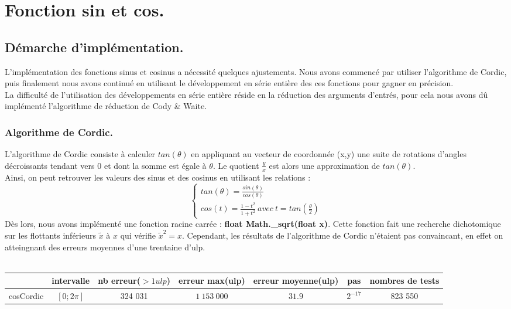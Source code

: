 \documentclass[a4,12pt]{article}
\begin{document}
\section{Fonction sin et cos.}
\subsection{Démarche d'implémentation.}
L'implémentation des fonctions sinus et cosinus a nécessité quelques ajustements. Nous avons commencé par utiliser l'algorithme de Cordic, puis finalement nous avons continué en utilisant le développement en série entière des ces fonctions pour gagner en précision. \\
La difficulté de l'utilisation des développements en série entière réside en la réduction des arguments d'entrés, pour cela nous avons dû implémenté l'algorithme de réduction de Cody \& Waite.
\subsubsection{Algorithme de Cordic.}
L'algorithme de Cordic consiste à calculer $tan(\theta)$ en appliquant au vecteur de coordonnée (x,y) une suite de rotations d'angles décroissants tendant vers 0 et dont la somme est égale à $\theta$. Le quotient $\frac{y}{x}$ est alors une approximation de $tan(\theta)$. \\
Ainsi, on peut retrouver les valeurs des sinus et des cosinus en utilisant les relations : 
$$
 \left \{
    \begin{array}{l}
        tan(\theta) = \frac{sin(\theta)}{cos(\theta)}\ \\
        cos(t) = \frac{1-t^2}{1+t^2}\ avec\ t = tan(\frac{\theta}{2})
    \end{array}
\right .
$$
Dès lors, nous avons implémenté une fonction racine carrée : \textbf{float Math.\_sqrt(float x)}. Cette fonction fait une recherche dichotomique sur les flottants inférieurs $\tilde x$ à $x$ qui vérifie $ \tilde x^2 = x $. Cependant, les résultats de l'algorithme de Cordic n'étaient pas convaincant, en effet on atteingnant des erreurs moyennes d'une trentaine d'ulp. \\
\\

\hspace{-4cm}
\begin{tabular}{|c|c|c|c|c|c|c|}

\hline 
 & intervalle & nb erreur($ >1 ulp$) & erreur max(ulp) & erreur moyenne(ulp) & pas & nombres de tests \\
\hline 
cosCordic & $[0; 2\pi]$ & 324 031 & $1\ 153\ 000$  & $31.9$ & $2^{-17}$ & 823 550 \\
\hline
\end{tabular}
\end{document}
